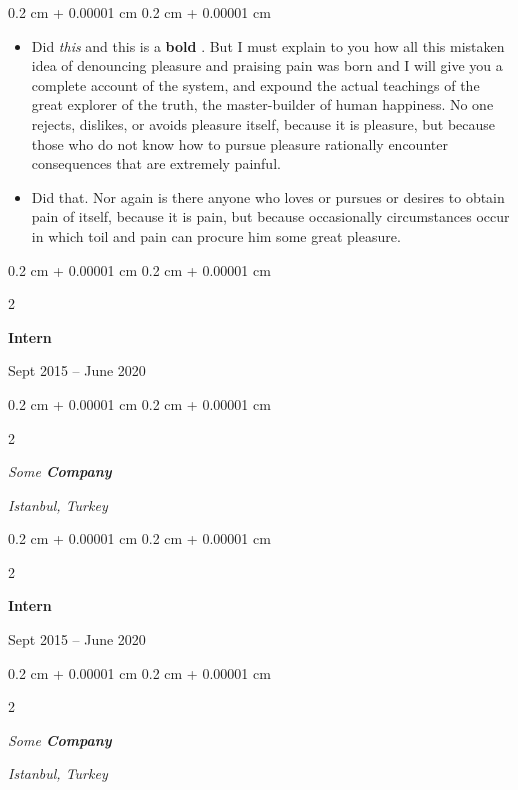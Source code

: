 \documentclass[10pt, letterpaper]{article}
\newenvironment{highlights}{
    \begin{itemize}[
        topsep=0.10 cm,
        parsep=0.10 cm,
        partopsep=0pt,
        itemsep=0pt,
        leftmargin=0.4 cm + 10pt
    ]
}{
    \end{itemize}
} %
\newenvironment{onecolentry}{
    \begin{adjustwidth}{
        0.2 cm + 0.00001 cm
    }{
        0.2 cm + 0.00001 cm
    }
}{
    \end{adjustwidth}
} %
\newenvironment{twocolentry}[2][]{
    \onecolentry
    \def\secondColumn{#2}
    \setcolumnwidth{\fill, 4.5 cm}
    \begin{paracol}{2}
}{
    \switchcolumn \raggedleft \secondColumn
    \end{paracol}
    \endonecolentry
} %
\let\hrefWithoutArrow\href
\renewcommand{\href}[2]{\hrefWithoutArrow{#1}{\ifthenelse{\equal{#2}{}}{ }{#2 }\raisebox{.15ex}{\footnotesize \faExternalLink*}}}
\begin{document}
        \vspace{0.10 cm}
        \begin{onecolentry}
            \begin{highlights}
                \item Did \textit{this} and this is a \textbf{bold} \href{https://example.com}{link}. But I must explain to you how all this mistaken idea of denouncing pleasure and praising pain was born and I will give you a complete account of the system, and expound the actual teachings of the great explorer of the truth, the master-builder of human happiness. No one rejects, dislikes, or avoids pleasure itself, because it is pleasure, but because those who do not know how to pursue pleasure rationally encounter consequences that are extremely painful.
                \item Did that. Nor again is there anyone who loves or pursues or desires to obtain pain of itself, because it is pain, but because occasionally circumstances occur in which toil and pain can procure him some great pleasure.
            \end{highlights}
        \end{onecolentry}


        \vspace{0.2 cm}

                \begin{twocolentry}{
                    Sept 2015 – June 2020
                }
                \textbf{Intern}
                \end{twocolentry}
            \begin{twocolentry}{
        \textit{Istanbul, Turkey}    }
            \textit{Some \textbf{Company}}
            \end{twocolentry}



        \vspace{0.2 cm}

                \begin{twocolentry}{
                    Sept 2015 – June 2020
                }
                \textbf{Intern}
                \end{twocolentry}
            \begin{twocolentry}{
        \textit{Istanbul, Turkey}    }
            \textit{Some \textbf{Company}}
            \end{twocolentry}



        \vspace{0.2 cm}
\end{document}
